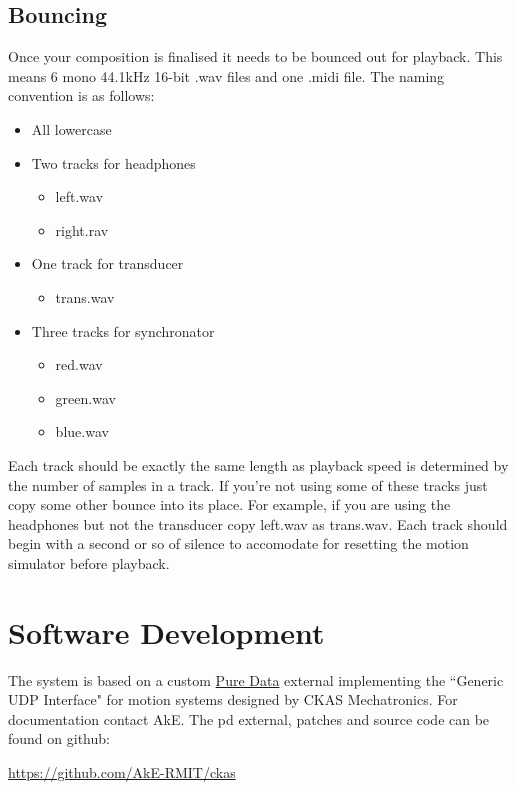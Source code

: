 \documentclass{article}
\begin{document}
	\subsection{Bouncing}
	Once your composition is finalised it needs to be bounced out for playback. 
	This means 6 mono 44.1kHz 16-bit .wav files and one .midi file. The naming 
	convention is as follows: 
	
	\begin{itemize}
		\item All lowercase
		\item Two tracks for headphones 
		\begin{itemize}
			\item left.wav
			\item right.rav
		\end{itemize}
		\item One track for transducer 
		\begin{itemize}
			\item trans.wav
		\end{itemize}
		\item Three tracks for synchronator
		\begin{itemize}
			\item red.wav
			\item green.wav
			\item blue.wav
		\end{itemize}
	\end{itemize}

	Each track should be exactly the same length as playback speed is 
	determined by the number of samples in a track. If you're not using some of 
	these tracks just copy some other bounce into its place. For example, if 
	you are using the headphones but not the transducer copy left.wav as 
	trans.wav. Each track should begin with a second or so of silence to 
	accomodate for resetting the motion simulator before playback. 

	\section{Software Development}
	\label{dev}
	The system is based on a custom \href{http://puredata.info}{Pure Data} 
	external implementing the ``Generic UDP Interface" for motion systems 
	designed by CKAS Mechatronics. For documentation contact AkE. The pd
	external, patches and source code can be found on github:

	\url{https://github.com/AkE-RMIT/ckas}\medskip
\end{document}
